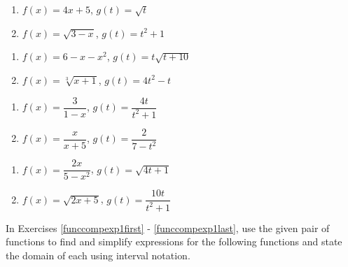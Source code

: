 \documentclass{ximera}
\begin{document}
\begin{multicols}{2}
\begin{enumerate}
\setcounter{enumi}{\value{HW}}

\item  $f(x) = 4x+5$, $g(t) = \sqrt{t}$
\item  $f(x) = \sqrt{3-x}$, $g(t) = t^2+1$

\setcounter{HW}{\value{enumi}}
\end{enumerate}
\end{multicols}

\begin{multicols}{2}
\begin{enumerate}
\setcounter{enumi}{\value{HW}}

\item  $f(x) = 6-x-x^2$, $g(t) = t\sqrt{t+10}$
\item  $f(x) = \sqrt[3]{x+1}$, $g(t) = 4t^2-t$

\setcounter{HW}{\value{enumi}}
\end{enumerate}
\end{multicols}

\begin{multicols}{2}
\begin{enumerate}
\setcounter{enumi}{\value{HW}}

\item  $f(x) = \dfrac{3}{1-x}$, $g(t) = \dfrac{4t}{t^2+1}$
\item  $f(x) = \dfrac{x}{x+5}$, $g(t) = \dfrac{2}{7-t^2}$


\setcounter{HW}{\value{enumi}}
\end{enumerate}
\end{multicols}

\begin{multicols}{2}
\begin{enumerate}
\setcounter{enumi}{\value{HW}}

\item  $f(x) = \dfrac{2x}{5-x^2}$, $g(t) = \sqrt{4t+1}$
\item  $f(x) =\sqrt{2x+5}$, $g(t) = \dfrac{10t}{t^2+1}$ \label{funccompeval1last}

\setcounter{HW}{\value{enumi}}
\end{enumerate}
\end{multicols}


In Exercises \ref{funccompexp1first} - \ref{funccompexp1last}, use the given pair of functions to find and simplify expressions for the following functions and state the domain of each using interval notation.
\end{document}
